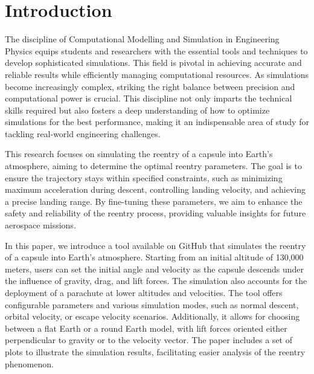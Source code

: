 \documentclass[runningheads]{llncs}
\newcommand{\francisco}[1]{\nbnote{francisco}{magenta}{#1}}
\begin{document}

\section{Introduction}
The discipline of Computational Modelling and Simulation in Engineering Physics equips students and researchers with the essential tools and techniques to develop sophisticated simulations. This field is pivotal in achieving accurate and reliable results while efficiently managing computational resources. As simulations become increasingly complex, striking the right balance between precision and computational power is crucial. This discipline not only imparts the technical skills required but also fosters a deep understanding of how to optimize simulations for the best performance, making it an indispensable area of study for tackling real-world engineering challenges.

This research focuses on simulating the reentry of a capsule into Earth's atmosphere, aiming to determine the optimal reentry parameters. The goal is to ensure the trajectory stays within specified constraints, such as minimizing maximum acceleration during descent, controlling landing velocity, and achieving a precise landing range. By fine-tuning these parameters, we aim to enhance the safety and reliability of the reentry process, providing valuable insights for future aerospace missions.

\francisco{meter git publico}
In this paper, we introduce a tool available on GitHub \cite{git} that simulates the reentry of a capsule into Earth's atmosphere. Starting from an initial altitude of 130,000 meters, users can set the initial angle and velocity as the capsule descends under the influence of gravity, drag, and lift forces. The simulation also accounts for the deployment of a parachute at lower altitudes and velocities. The tool offers configurable parameters and various simulation modes, such as normal descent, orbital velocity, or escape velocity scenarios. Additionally, it allows for choosing between a flat Earth or a round Earth model, with lift forces oriented either perpendicular to gravity or to the velocity vector. The paper includes a set of plots to illustrate the simulation results, facilitating easier analysis of the reentry phenomenon.
\end{document}
